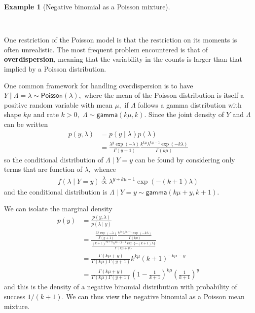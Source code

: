 \documentclass[
  11pt,
  letterpaper,
]{scrbook}
\theoremstyle{definition}
\newtheorem{example}{Example}[chapter]
\theoremstyle{plain}
\theoremstyle{plain}
\theoremstyle{plain}
\theoremstyle{definition}
\theoremstyle{definition}
\theoremstyle{plain}
\theoremstyle{plain}
\theoremstyle{remark}
\begin{document}
\begin{example}[Negative binomial as a Poisson
mixture]\protect\hypertarget{exm-poisson-negbin}{}\label{exm-poisson-negbin}

~

One restriction of the Poisson model is that the restriction on its
moments is often unrealistic. The most frequent problem encountered is
that of \textbf{overdispersion}, meaning that the variability in the
counts is larger than that implied by a Poisson distribution.

One common framework for handling overdispersion is to have
\(Y \mid \Lambda = \lambda \sim \mathsf{Poisson}(\lambda),\) where the
mean of the Poisson distribution is itself a positive random variable
with mean \(\mu,\) if \(\Lambda\) follows a gamma distribution with
shape \(k\mu\) and rate \(k>0,\)
\(\Lambda \sim \mathsf{gamma}(k\mu, k).\) Since the joint density of
\(Y\) and \(\Lambda\) can be written \begin{align*}
p(y, \lambda) &= p(y \mid \lambda)p(\lambda) \\
&= \frac{\lambda^y\exp(-\lambda)}{\Gamma(y+1)}  \frac{k^{k\mu}\lambda^{k\mu-1}\exp(-k\lambda)}{\Gamma(k\mu)}
\end{align*} so the conditional distribution of \(\Lambda \mid Y=y\) can
be found by considering only terms that are function of \(\lambda,\)
whence \begin{align*}
f(\lambda \mid Y=y) \stackrel{\lambda}{\propto}\lambda^{y+k\mu-1}\exp(-(k+1)\lambda)
\end{align*} and the conditional distribution is
\(\Lambda \mid Y=y \sim \mathsf{gamma}(k\mu + y, k+1).\)

We can isolate the marginal density \begin{align*}
p(y) &= \frac{p(y, \lambda)}{p(\lambda \mid y)} \\&= \frac{\frac{\lambda^y\exp(-\lambda)}{\Gamma(y+1)}  \frac{k^{k\mu}\lambda^{k\mu-1}\exp(-k\lambda)}{\Gamma(k\mu)}}{ \frac{(k+1)^{k\mu+y}\lambda^{k\mu+y-1}\exp\{-(k+1)\lambda\}}{\Gamma(k\mu+y)}}\\
&= \frac{\Gamma(k\mu+y)}{\Gamma(k\mu)\Gamma(y+1)}k^{k\mu} (k+1)^{-k\mu-y}\\&= \frac{\Gamma(k\mu+y)}{\Gamma(k\mu)\Gamma(y+1)}\left(1-\frac{1}{k+1}\right)^{k\mu} \left(\frac{1}{k+1}\right)^y
\end{align*} and this is the density of a negative binomial distribution
with probability of success \(1/(k+1).\) We can thus view the negative
binomial as a Poisson mean mixture.


\end{example}
\end{document}
